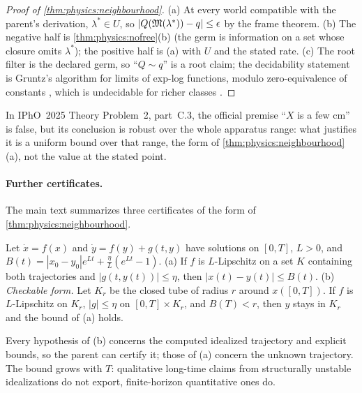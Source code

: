 \begin{proof}[Proof of \cref{thm:physics:neighbourhood}]
(a) At every world compatible with the parent's derivation, $\lambda^*\in U$, so
$|Q(\mathfrak{M}(\lambda^*))-q|\le\epsilon$ by the frame theorem. (b) The negative half is
\cref{thm:physics:nofree}(b) (the germ is information on a set whose closure omits
$\lambda^*$); the positive half is (a) with $U$ and the stated rate. (c) The root filter is
the declared germ, so ``$Q\sim q$'' is a root claim; the decidability statement is
Gruntz's algorithm for limits of exp-log functions, modulo zero-equivalence of constants
\citep{gruntz1996computing}, which is undecidable for richer classes
\citep{richardson1968some}.
\end{proof}

In IPhO~2025 Theory Problem~2, part~C.3, the official premise ``$X$ is a few cm'' is false,
but its conclusion is robust over the whole apparatus range: what justifies it is a uniform
bound over that range, the form of \cref{thm:physics:neighbourhood}(a), not the value at the
stated point.

\paragraph{Further certificates.} The main text summarizes three certificates of the form
of \cref{thm:physics:neighbourhood}.

\begin{theorem}\label{thm:physics:gronwall}
Let $\dot x=f(x)$ and $\dot y=f(y)+g(t,y)$ have solutions on $[0,T]$, $L>0$, and
$B(t)=|x_0-y_0|e^{Lt}+\frac\eta L(e^{Lt}-1)$. (a) If $f$ is $L$-Lipschitz on a set $K$
containing both trajectories and $|g(t,y(t))|\le\eta$, then $|x(t)-y(t)|\le B(t)$. (b)
\emph{Checkable form.} Let $K_r$ be the closed tube of radius $r$ around $x([0,T])$. If $f$
is $L$-Lipschitz on $K_r$, $|g|\le\eta$ on $[0,T]\times K_r$, and $B(T)<r$, then $y$ stays
in $K_r$ and the bound of (a) holds.
\end{theorem}

Every hypothesis of (b) concerns the computed idealized trajectory and explicit bounds,
so the parent can certify it; those of (a) concern the unknown trajectory. The bound grows
with $T$: qualitative long-time claims from structurally unstable idealizations do not
export, finite-horizon quantitative ones do.


